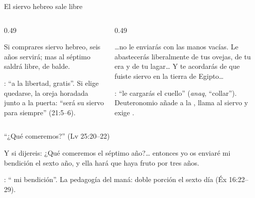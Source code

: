 \begin{frame}{El siervo hebreo sale libre}
\begin{columns}[t,onlytextwidth]
\begin{column}{0.49\textwidth}
\begin{cita}Si comprares siervo hebreo, seis años servirá; mas al séptimo saldrá libre, de balde.\end{cita}
\scriptsize {}: ``a la libertad, gratis''. Si elige quedarse, la oreja horadada junto a la puerta: ``será su siervo para siempre'' (21:5--6).
\end{column}
\begin{column}{0.49\textwidth}
\begin{cita}\ldots{}no le enviarás con las manos vacías. Le abastecerás liberalmente de tus ovejas, de tu era y de tu lagar\ldots{} Y te acordarás de que fuiste siervo en la tierra de Egipto\ldots{}\end{cita}
\scriptsize {}: ``le cargarás el cuello'' (\emph{anaq}, ``collar''). Deuteronomio añade a la , llama al siervo  y exige .
\end{column}
\end{columns}
\end{frame}

\begin{frame}{``¿Qué comeremos?'' (Lv 25:20--22)}
\begin{cita}Y si dijereis: ¿Qué comeremos el séptimo año?\ldots{} entonces yo os enviaré mi bendición el sexto año, y ella hará que haya fruto por tres años.\end{cita}
\centering
{}\par\smallskip
\small\RaggedRight {}: `` mi bendición''. La pedagogía del maná: doble porción el sexto día (Éx 16:22--29).
\end{frame}

